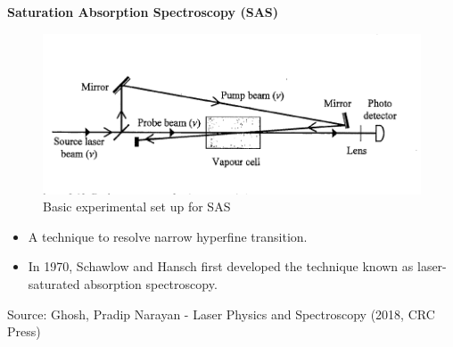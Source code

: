 \documentclass[9pt,aspectratio94]{beamer}
\begin{document}
\begin{frame}{\textbf{Saturation Absorption Spectroscopy (SAS)}}
\begin{figure}
    \centering
    \includegraphics[scale=0.4]{SAS.png}
    \caption{Basic experimental set up for SAS}
    \label{fig:figure 2}
\end{figure}
\begin{itemize}
    \item A technique to resolve narrow hyperfine  transition.
    \item In 1970, Schawlow and Hansch first developed the technique known as laser-saturated absorption spectroscopy. 
\end{itemize}

\tiny{Source: Ghosh, Pradip Narayan - Laser Physics and Spectroscopy (2018, CRC Press)}
\end{frame}
\end{document}
